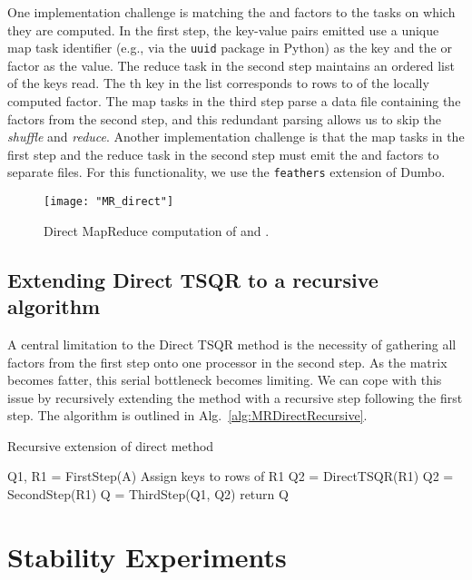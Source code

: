 \documentclass[10pt, conference, compsocconf]{IEEEtran}
\begin{document}
One implementation challenge is matching the  and  factors to the tasks on which they are computed.  In the first step, the key-value pairs emitted use a unique map task identifier (e.g., via the \texttt{uuid} package in Python) as the key and the  or  factor as the value.  The reduce task in the second step maintains an ordered list of the keys read.  The th key in the list corresponds to rows  to  of the locally computed  factor.  The map tasks in the third step parse a data file containing the  factors from the second step, and this redundant parsing allows us to skip the \emph{shuffle} and \emph{reduce}.  Another implementation challenge is that the map tasks in the first step and the reduce task in the second step must emit the  and  factors to separate files.  For this functionality, we use the \texttt{feathers} extension of Dumbo.

\begin{figure*}
\centering
\texttt{[image: "MR\_direct"]}
\caption{Direct MapReduce computation of  and .}
\label{fig:MR_full}
\end{figure*}


\subsection{Extending Direct TSQR to a recursive algorithm}\label{sec:recursive}

A central limitation to the Direct TSQR method is the necessity of gathering all  factors from the first step onto one processor in the second step.  As the matrix becomes fatter, this serial bottleneck becomes limiting.  We can cope with this issue by recursively extending the method with a recursive step following the first step.  The algorithm is outlined in Alg.~\ref{alg:MRDirectRecursive}.

\begin{algorithm}
  \caption{Recursive extension of direct method}
  \label{alg:MRDirectRecursive}
  \begin{algorithmic}
    \State Q1, R1 = FirstStep(A)
      \State Assign keys to rows of R1
      \State Q2 = DirectTSQR(R1)
    \Else
      \State Q2 = SecondStep(R1)
    \EndIf
    \State Q = ThirdStep(Q1, Q2)
    \State return Q
  \EndFunction
  \end{algorithmic}
\end{algorithm}

\section{Stability Experiments}\label{sec:stability}
\end{document}
